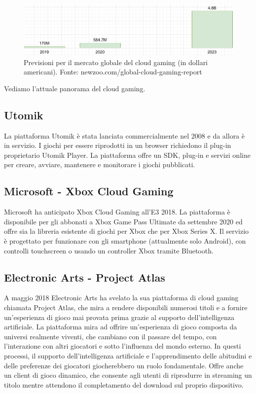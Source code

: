 \begin{figure}[H]
	\includegraphics[width=\linewidth]{immagini/Newzoo_Cloud_Gaming_Revenues}
	\caption{Previsioni per il mercato globale del cloud gaming (in dollari americani). Fonte: newzoo.com/global-cloud-gaming-report}
	\label{fig:Newzoo_Cloud_Gaming_Revenues_Sept_2020}
\end{figure}

Vediamo l'attuale panorama del cloud gaming.

\subsection{Utomik}
La piattaforma Utomik è stata lanciata commercialmente nel 2008 e da allora è in servizio. I giochi per essere riprodotti in un browser richiedono il plug-in proprietario Utomik Player. La piattaforma offre un SDK, plug-in e servizi online per creare, avviare, mantenere e monitorare i giochi pubblicati\cite{Utomik}.

\subsection{Microsoft - Xbox Cloud Gaming}
Microsoft ha anticipato Xbox Cloud Gaming all'E3 2018. La piattaforma è disponibile per gli abbonati a Xbox Game Pass Ultimate da settembre 2020 ed offre sia la libreria esistente di giochi per Xbox che per Xbox Series X. Il servizio è progettato per funzionare con gli smartphone (attualmente solo Android), con controlli touchscreen o usando un controller Xbox tramite Bluetooth\cite{Xbox_Game_Pass_cloud_gaming}.

\subsection{Electronic Arts - Project Atlas}
A maggio 2018 Electronic Arts ha svelato la sua piattaforma di cloud gaming chiamata Project Atlas, che mira a rendere disponibili numerosi titoli e a fornire un'esperienza di gioco mai provata prima grazie al supporto dell'intelligenza artificiale. La piattaforma mira ad offrire un'esperienza di gioco composta da universi realmente viventi, che cambiano con il passare del tempo, con l'interazione con altri giocatori e sotto l'influenza del mondo esterno. In questi processi, il supporto dell'intelligenza artificiale e l'apprendimento delle abitudini e delle preferenze dei giocatori giocherebbero un ruolo fondamentale. Offre anche un client di gioco dinamico, che consente agli utenti di riprodurre in streaming un titolo mentre attendono il completamento del download sul proprio dispositivo\cite{Project_Atlas}.

